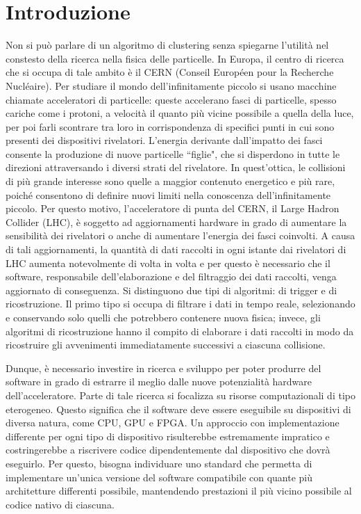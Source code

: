 \documentclass[12pt,a4paper]{report}
\begin{document}
\chapter*{Introduzione}

Non si può parlare di un algoritmo di clustering senza spiegarne l'utilità nel constesto della ricerca nella fisica delle particelle. In Europa, il centro di ricerca che si occupa di tale ambito è il CERN (Conseil Européen pour la Recherche Nucléaire). Per studiare il mondo dell'infinitamente piccolo si usano macchine chiamate acceleratori di particelle: queste accelerano fasci di particelle, spesso cariche come i protoni, a velocità il quanto più vicine possibile a quella della luce, per poi farli scontrare tra loro in corrispondenza di specifici punti in cui sono presenti dei dispositivi rivelatori. L'energia derivante dall'impatto dei fasci consente la produzione di nuove particelle ``figlie", che si disperdono in tutte le direzioni attraversando i diversi strati del rivelatore. In quest'ottica, le collisioni di più grande interesse sono quelle a maggior contenuto energetico e più rare, poiché consentono di definire nuovi limiti nella conoscenza dell'infinitamente piccolo. Per questo motivo, l'acceleratore di punta del CERN, il Large Hadron Collider (LHC), è soggetto ad aggiornamenti hardware in grado di aumentare la sensibilità dei rivelatori o anche di aumentare l'energia dei fasci coinvolti. A causa di tali aggiornamenti, la quantità di dati raccolti in ogni istante dai rivelatori di LHC aumenta notevolmente di volta in volta e per questo è necessario che il software, responsabile dell'elaborazione e del filtraggio dei dati raccolti, venga aggiornato di conseguenza. Si distinguono due tipi di algoritmi: di trigger e di ricostruzione. Il primo tipo si occupa di filtrare i dati in tempo reale, selezionando e conservando solo quelli che potrebbero contenere nuova fisica; invece, gli algoritmi di ricostruzione hanno il compito di elaborare i dati raccolti in modo da ricostruire gli avvenimenti immediatamente successivi a ciascuna collisione.

Dunque, è necessario investire in ricerca e sviluppo per poter produrre del software in grado di estrarre il meglio dalle nuove potenzialità hardware dell'acceleratore. Parte di tale ricerca si focalizza su risorse computazionali di tipo eterogeneo. Questo significa che il software deve essere eseguibile su dispositivi di diversa natura, come CPU, GPU e FPGA. Un approccio con implementazione differente per ogni tipo di dispositivo risulterebbe estremamente impratico e costringerebbe a riscrivere codice dipendentemente dal dispositivo che dovrà eseguirlo. Per questo, bisogna individuare uno standard che permetta di implementare un'unica versione del software compatibile con quante più architetture differenti possibile, mantendendo prestazioni il più vicino possibile al codice nativo di ciascuna. 
\end{document}
